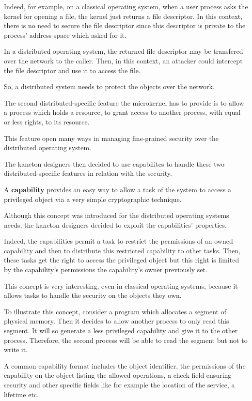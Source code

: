 \begin{multicols}{2}
Indeed, for example, on a classical operating system, when a user process
asks the kernel for opening a file, the kernel just returns a file descriptor.
In this context, there is no need to secure the file descriptor since
this descriptor is private to the process' address space which asked for it.

In a distributed operating system, the returned file descriptor may
be transfered over the network to the caller. Then, in this context,
an attacker could intercept the file descriptor and use it to access
the file.

So, a distributed system needs to protect the objects over the network.

The second distributed-specific feature the microkernel has to provide
is to allow a process which holds a resource, to grant access to another
process, with equal or less rights, to its resource.

This feature open many ways in managing fine-grained security over
the distributed operating system.

The kaneton designers then decided to use capabilites to handle these
two distributed-specific features in relation with the security.

A \textbf{capability} provides an easy way to allow a task of the
system to access a privileged object via a very simple cryptographic
technique.

Although this concept was introduced for the distributed operating systems
needs, the kaneton designers decided to exploit the capabilities' properties.

Indeed, the capabilities permit a task to restrict the permissions
of an owned capability and then to distribute this restricted capability
to other tasks. Then, these tasks get the right to access the privileged
object but this right is limited by the capability's permissions the
capability's owner previously set.

This concept is very interesting, even in classical operating systems,
because it allows tasks to handle the security on the objects they own.

To illustrate this concept, consider a program which allocates a segment of
physical memory. Then it decides to allow another process to only read
this segment. It will so generate a less privileged capability and give
it to the other process. Therefore, the second process will be able to read
the segment but not to write it.

A common capability format includes the object identifier, the permissions
of the capability on the object listing the allowed operations, a check field
ensuring security and other specific fields like for example the location
of the service, a lifetime etc.


\end{multicols}
